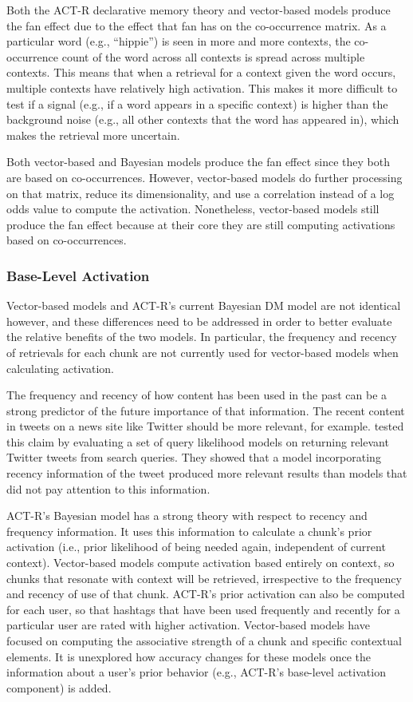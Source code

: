 \documentclass[man,floatsintext,donotrepeattitle]{apa6}
\begin{document}
Both the ACT-R declarative memory theory and vector-based models produce the fan effect due to the effect that fan has on the co-occurrence matrix.
As a particular word (e.g., ``hippie'') is seen in more and more contexts, the co-occurrence count of the word across all contexts is spread across multiple contexts.
This means that when a retrieval for a context given the word occurs, multiple contexts have relatively high activation.
This makes it more difficult to test if a signal (e.g., if a word appears in a specific context) is higher than the background noise (e.g., all other contexts that the word has appeared in),
which makes the retrieval more uncertain.

Both vector-based and Bayesian models produce the fan effect since they both are based on co-occurrences.
However, vector-based models do further processing on that matrix, reduce its dimensionality, and use a correlation instead of a log odds value to compute the activation.
Nonetheless, vector-based models still produce the fan effect because at their core they are still computing activations based on co-occurrences.

\subsubsection{Base-Level Activation}

Vector-based models and ACT-R's current Bayesian DM model are not identical however, and these differences need to be addressed in order to better evaluate the relative benefits of the two models. 
In particular, the frequency and recency of retrievals for each chunk are not currently used for vector-based models when calculating activation.

The frequency and recency of how content has been used in the past can be a strong predictor of the future importance of that information. 
The recent content in tweets on a news site like Twitter should be more relevant, for example.
\textcite{Efron2011} tested this claim by evaluating a set of query likelihood models on returning relevant Twitter tweets from search queries.
They showed that a model incorporating recency information of the tweet produced more relevant results than models that did not pay attention to this information.

ACT-R's Bayesian model has a strong theory with respect to recency and frequency information.
It uses this information to calculate a chunk's prior activation (i.e., prior likelihood of being needed again, independent of current context).
Vector-based models compute activation based entirely on context, so chunks that resonate with context will be retrieved, irrespective to the frequency and recency of use of that chunk.
ACT-R's prior activation can also be computed for each user, so that hashtags that have been used frequently and recently for a particular user are rated with higher activation.
Vector-based models have focused on computing the associative strength of a chunk and specific contextual elements.
It is unexplored how accuracy changes for these models once the information about a user's prior behavior (e.g., ACT-R's base-level activation component) is added.
\end{document}
